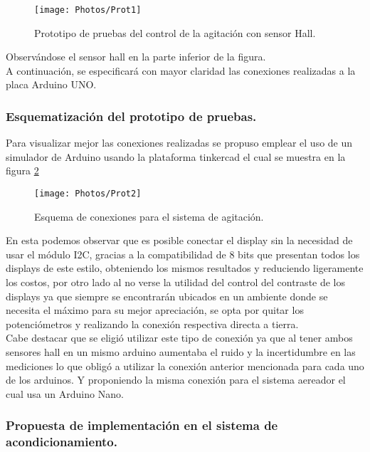 \documentclass[11pt,letter
								]
								{article}
\begin{document}
\begin{figure}[H]
\centering
\texttt{[image: Photos/Prot1]}
\caption{Prototipo de pruebas  del control de la agitación con sensor Hall. }
\label{Prot1}
\end{figure}

Observándose el sensor  hall en la parte inferior de la figura.\\
A continuación, se especificará con mayor claridad las conexiones realizadas a la placa Arduino UNO. 
		


		\subsubsection{Esquematización del prototipo de pruebas.}

Para visualizar mejor las conexiones realizadas se propuso emplear  el uso de un simulador de Arduino usando la plataforma tinkercad \cite{tink} el cual se muestra en la figura \ref{Conexiones}


\begin{figure}[H]
\centering
\texttt{[image: Photos/Prot2]}
\caption{Esquema de conexiones para el sistema de agitación.  }
\label{Conexiones}
\end{figure}

En esta podemos observar que es posible conectar el display sin la necesidad de usar  el módulo  I2C, gracias a la compatibilidad de 8 bits que presentan  todos los displays de este estilo,   obteniendo los mismos resultados y reduciendo ligeramente los costos, por otro lado al no verse la utilidad del control del contraste de los displays ya  que siempre se encontrarán ubicados en un ambiente donde se necesita el máximo para su mejor apreciación, se opta por quitar los potenciómetros y realizando la conexión  respectiva directa a tierra. \\

Cabe destacar que se eligió utilizar este tipo de conexión ya que al tener ambos sensores hall en un mismo arduino aumentaba el ruido y la incertidumbre en las mediciones lo que obligó a utilizar la conexión anterior mencionada para cada uno de los arduinos. Y proponiendo  la misma conexión para el sistema aereador el cual usa un Arduino Nano. 

\subsubsection{Propuesta de implementación en el sistema de  acondicionamiento. }
\end{document}

